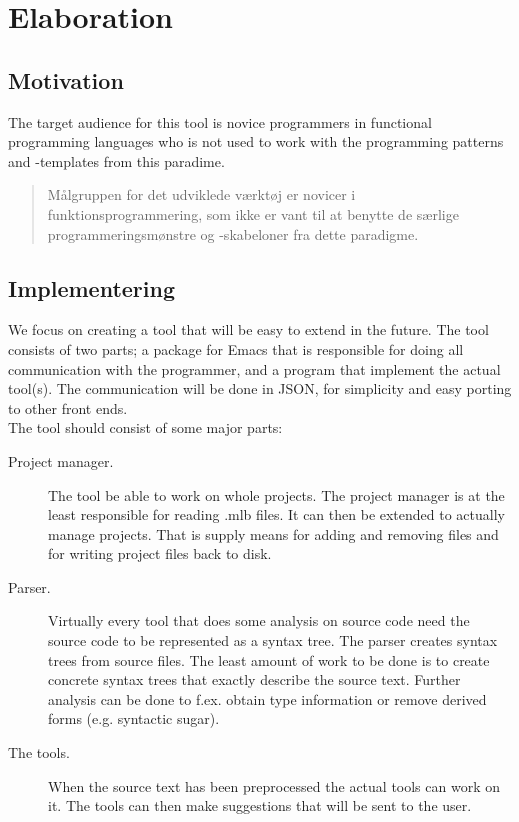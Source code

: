\documentclass[a4paper,oneside]{memoir}
\begin{document}
\section{Elaboration}

\subsection{Motivation}

The target audience for this tool is novice programmers in functional
programming languages who is not used to work with the programming patterns
and -templates from this paradime. 

\begin{quotation}
  Målgruppen for det udviklede værktøj er novicer i funktionsprogrammering, som
  ikke er vant til at benytte de særlige programmeringsmønstre og -skabeloner
  fra dette paradigme.
\end{quotation}



\subsection{Implementering}
We focus on creating a tool that will be easy to extend in the future. The tool consists of two
parts; a package for Emacs that is responsible for doing all communication with the programmer, and
a program that implement the actual tool(s). The communication will be done in JSON, for simplicity
and easy porting to other front ends.\\

The tool should consist of some major parts:
\begin{description}
\item[Project manager.] The tool be able to work on whole projects. The project manager is at the
least responsible for reading .mlb files. It can then be extended to actually manage projects. That
is supply means for adding and removing files and for writing project files back to disk.
\item[Parser.] Virtually every tool that does some analysis on source code need the source code to
be represented as a syntax tree. The parser creates syntax trees from source files. The least amount
of work to be done is to create concrete syntax trees that exactly describe the source text. Further
analysis can be done to f.ex. obtain type information or remove derived forms (e.g. syntactic
sugar).
\item[The tools.] When the source text has been preprocessed the actual tools can work on it. The
tools can then make suggestions that will be sent to the user.
\end{description}
\end{document}
